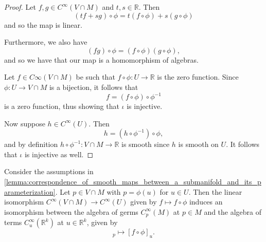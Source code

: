\documentclass[notoc,notitlepage]{tufte-book}
\begin{document}
\begin{proof}
   Let $f, g \in C^\infty(V \cap M)$ and $t,
  s \in \mathbb{R}$. Then
  \begin{equation*}
    (tf + sg) \circ \phi = t(f \circ \phi) + s(g \circ \phi)
  \end{equation*}
  and so the map is linear.

  \noindent
   Furthermore, we also have
  \begin{equation*}
    (fg) \circ \phi = (f \circ \phi)(g \circ \phi),
  \end{equation*}
  and so we have that our map is a homomorphism of algebras.

  \noindent
   Let $f \in C\infty(V \cap M)$
  be such that $f \circ \phi : U \to \mathbb{R}$ is the zero function. Since
  $\phi : U \to V \cap M$ is a bijection, it follows that
  \begin{equation*}
    f = (f \circ \phi) \circ \phi^{-1}
  \end{equation*}
  is a zero function, thus showing that $\iota$ is injective.

  Now suppose $h \in C^{\infty}(U)$. Then
  \begin{equation*}
    h = (h \circ \phi^{-1}) \circ \phi,
  \end{equation*}
  and by definition $h \circ \phi^{-1} : V \cap M \to \mathbb{R}$ is smooth
  since $h$ is smooth on $U$. It follows that $\iota$ is injective as well.
\end{proof}

\begin{crly}\label{crly:isomorphism_between_algebra_of_germs}
  Consider the assumptions in
  \cref{lemma:correspondence_of_smooth_maps_between_a_submanifold_and_its_parameterization}.
  Let $p \in V \cap M$ with $p = \phi(u)$ for $u \in U$. Then the linear
  isomorphism $C^\infty (V \cap M) \to C^\infty (U)$ given by $f \mapsto f \circ
  \phi$ induces an isomorphism between the algebra of germs $C_p^\infty(M)$ at
  $p \in M$ and the algebra of terms $C_u^\infty(\mathbb{R}^k)$ at $u \in
  \mathbb{R}^k$, given by
  \begin{equation*}
    [f]_p \mapsto [f \circ \phi]_u.
  \end{equation*}
\end{crly}
\end{document}
